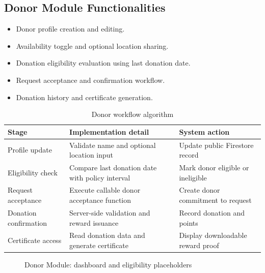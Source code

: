 \subsection{Donor Module Functionalities}

\begin{itemize}
    \item Donor profile creation and editing.
    \item Availability toggle and optional location sharing.
    \item Donation eligibility evaluation using last donation date.
    \item Request acceptance and confirmation workflow.
    \item Donation history and certificate generation.
\end{itemize}

\begin{table}[H]
\centering
\caption{Donor workflow algorithm}
\begin{tabularx}{\textwidth}{|p{4.2cm}|X|p{4.0cm}|}
\hline
\textbf{Stage} & \textbf{Implementation detail} & \textbf{System action} \\
\hline
Profile update & Validate name and optional location input & Update public Firestore record \\
\hline
Eligibility check & Compare last donation date with policy interval & Mark donor eligible or ineligible \\
\hline
Request acceptance & Execute callable donor acceptance function & Create donor commitment to request \\
\hline
Donation confirmation & Server-side validation and reward issuance & Record donation and points \\
\hline
Certificate access & Read donation data and generate certificate & Display downloadable reward proof \\
\hline
\end{tabularx}
\end{table}

\begin{figure}[H]
\centering
{}
\caption{Donor Module: dashboard and eligibility placeholders}
\end{figure}


